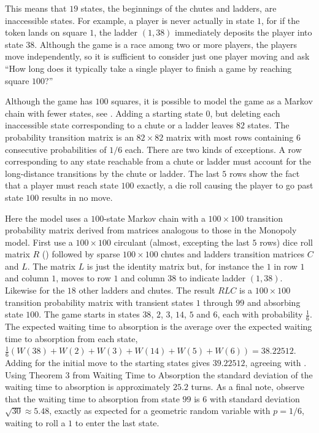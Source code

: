 \documentclass[12pt]{article}
\begin{document}
This means that \( 19 \) states, the beginnings of the chutes and
ladders, are inaccessible states.  For example, a player is never
actually in state \( 1 \), for if the token lands on square \( 1 \), the
ladder \( (1,38) \) immediately deposits the player into state \( 38 \).
Although the game is a race among two or more players, the players move
independently, so it is sufficient to consider just one player moving
and ask ``How long does it typically take a single player to finish a
game by reaching square \( 100 \)?''

Although the game has \( 100 \) squares, it is possible to model the
game as a Markov chain with fewer states, see
\cite{althoen93}.  Adding a starting state \( 0 \), but deleting each
inaccessible state corresponding to a chute or a ladder leaves \( 82 \)
states.  The probability transition matrix is an \( 82 \times 82 \)
matrix with most rows containing \( 6 \) consecutive probabilities of \(
1/6 \) each.  There are two kinds of exceptions.  A row corresponding to
any state reachable from a chute or ladder must account for the
long-distance transitions by the chute or ladder.  The last \( 5 \) rows
show the fact that a player must reach state \( 100 \) exactly, a die
roll causing the player to go past state \( 100 \) results in no move.

Here the model uses a \( 100 \)-state Markov chain with a \( 100 \times
100 \) transition probability matrix derived from matrices analogous to
those in the Monopoly model.  First use a \( 100 \times 100 \) circulant
(almost, excepting the last \( 5 \) rows) dice roll matrix \( R \) ()
followed by sparse \( 100 \times 100 \) chutes and ladders transition
matrices \( C \) and \( L \). The matrix \( L \) is just the identity
matrix but, for instance the \( 1 \) in row \( 1 \) and column \( 1 \),
moves to row \( 1 \) and column \( 38 \) to indicate ladder \( (1,38) \).
Likewise for the \( 18 \) other ladders and chutes.  The result \( RLC \)
is a \( 100 \times 100 \) transition probability matrix with transient
states \( 1 \) through \( 99 \) and absorbing state \( 100 \).  The game
starts in states \( 38 \), \( 2 \), \( 3 \), \( 14 \), \( 5 \) and \( 6 \),
each with probability \( \frac{1} {6} \).  The expected waiting time to
absorption is the average over the expected waiting time to absorption
from each state, \( \frac{1}{6}\left( W(38) + W(2) + W(3) + W(14) + W(5)
+ W(6) \right) = 38.22512 \).  Adding for the initial move to the
starting states gives \( 39.22512 \), agreeing with
\cite{althoen93}.  Using Theorem 3 from 
{Waiting Time to Absorption} the standard deviation of the waiting time
to absorption is approximately \( 25.2 \) turns.  As a final note,
observe that the waiting time to absorption from state \( 99 \) is \( 6 \)
with standard deviation \( \sqrt{30} \approx 5.48 \), exactly as
expected for a geometric random variable with \( p=1/6 \), waiting to
roll a \( 1 \) to enter the last state.~%
\end{document}
